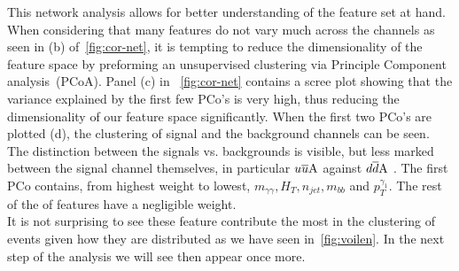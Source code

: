 This network analysis allows for better understanding of the feature set at hand. When considering that many features do not vary much across the channels as seen in (b) of~\autoref{fig:cor-net}, it is tempting to reduce the dimensionality of the feature space by preforming an unsupervised clustering via Principle Component analysis~(PCoA). Panel (c) in ~\autoref{fig:cor-net} contains a scree plot showing that the variance explained by the first few PCo's is very high, thus reducing the dimensionality of our feature space significantly. When the first two PCo's are plotted (d), the clustering of signal and the background channels  can be seen. The distinction between  the signals vs. backgrounds is visible, but less marked between the signal channel themselves, in particular $u\overline u \rm A$ against $d\overline d \rm A$ .  The first PCo contains, from highest weight to lowest, $m_{\gamma \gamma}, H_T, n_{jet}, m_{bb}$ and $p_T^{\gamma_1}$. The rest of the of features have a negligible weight. \\ It is not surprising to see these feature contribute the most in the clustering of events given how they are distributed as we have seen in~\autoref{fig:voilen}. In the next step of the analysis we will see then appear once more.
